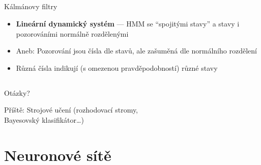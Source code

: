 \documentclass{beamer}
\begin{document}
\subsection{}
\begin{frame}{Kálmánovy filtry}
\begin{itemize}
\item {\bf Lineární dynamický systém} --- HMM se ``spojitými stavy'' a stavy i pozorováními normálně rozdělenými
\item Aneb: Pozorování jsou čísla dle stavů, ale zašuměná dle normálního rozdělení
\item Různá čísla indikují (s omezenou pravděpodobností) různé stavy
\end{itemize}
\end{frame}

\subsection{}
\begin{frame}{Otázky?}
\begin{center}
Příště: Strojové učení (rozhodovací stromy, \\ Bayesovský klasifikátor\dots)
\end{center}
\end{frame}

\section{Neuronové sítě}
\end{document}
